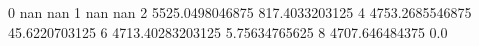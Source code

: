 0 nan nan
1 nan nan
2 5525.0498046875 817.4033203125
4 4753.2685546875 45.6220703125
6 4713.40283203125 5.75634765625
8 4707.646484375 0.0
